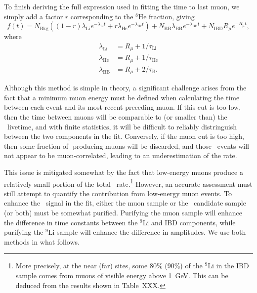 \documentclass[../thesis.tex]{subfiles}
\begin{document}
To finish deriving the full expression used in fitting the time to last muon, we simply add a factor $r$ corresponding to the $^8$He fraction, giving
\begin{equation}
  \label{eq:bkgLi9FullExpr}
  f(t) = N_{\mathrm{Bkg}} \left( (1-r)\lambda_{\mathrm{Li}} e^{-\lambda_{\mathrm{Li}} t} + r\lambda_{\mathrm{He}} e^{-\lambda_{\mathrm{He}} t }\right) + N_{\mathrm{BB}} \lambda_{\mathrm{BB}} e^{-\lambda_{\mathrm{BB}} t} + N_{\mathrm{IBD}} R_\mu e^{-R_\mu t},
\end{equation}
where
\begin{align*}
  \lambda_{\mathrm{Li}} &= R_\mu + 1/\tau_{\mathrm{Li}} \\
  \lambda_{\mathrm{He}} &= R_\mu + 1/\tau_{\mathrm{He}} \\
  \lambda_{\mathrm{BB}} &= R_\mu + 2/\tau_{\mathrm{B}}.
\end{align*}

Although this method is simple in theory, a significant challenge arises from the fact that a minimum muon energy must be defined when calculating the time between each event and its most recent preceding muon. If this cut is too low, then the time between muons will be comparable to (or smaller than) the \linine\ livetime, and with finite statistics, it will be difficult to reliably distringuish between the two components in the fit. Conversely, if the muon cut is too high, then some fraction of \linine-producing muons will be discarded, and those \linine\ events will not appear to be muon-correlated, leading to an underestimation of the rate.

This issue is mitigated somewhat by the fact that low-energy muons produce a relatively small portion of the total \linine\ rate.\footnote{More precisely, at the near (far) sites, some 80\% (90\%) of the $^9$Li in the IBD sample comes from muons of visible energy above 1~GeV. This can be deduced from the results shown in Table~XXX.}
However, an accurate assessment must still attempt to quantify the contribution from low-energy muon events. To enhance the \linine\ signal in the fit, either the muon sample or the \linine\ candidate sample (or both) must be somewhat purified. Purifying the muon sample will enhance the difference in time constants between the $^9$Li and IBD components, while purifying the $^9$Li sample will enhance the difference in amplitudes. We use both methods in what follows.
\end{document}
